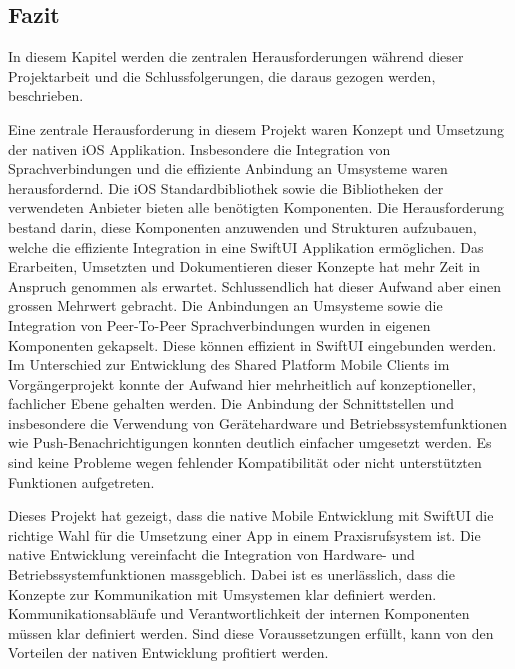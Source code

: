 \subsection{Fazit}

In diesem Kapitel werden die zentralen Herausforderungen während dieser Projektarbeit und die Schlussfolgerungen, die daraus gezogen werden, beschrieben.

Eine zentrale Herausforderung in diesem Projekt waren Konzept und Umsetzung der nativen iOS Applikation.
Insbesondere die Integration von Sprachverbindungen und die effiziente Anbindung an Umsysteme waren herausfordernd.
Die iOS Standardbibliothek sowie die Bibliotheken der verwendeten Anbieter bieten alle benötigten Komponenten.
Die Herausforderung bestand darin, diese Komponenten anzuwenden und Strukturen aufzubauen, welche die effiziente Integration in eine SwiftUI Applikation ermöglichen.
Das Erarbeiten, Umsetzten und Dokumentieren dieser Konzepte hat mehr Zeit in Anspruch genommen als erwartet.
Schlussendlich hat dieser Aufwand aber einen grossen Mehrwert gebracht.
Die Anbindungen an Umsysteme sowie die Integration von Peer-To-Peer Sprachverbindungen wurden in eigenen Komponenten gekapselt.
Diese können effizient in SwiftUI eingebunden werden.
Im Unterschied zur Entwicklung des Shared Platform Mobile Clients im Vorgängerprojekt konnte der Aufwand hier mehrheitlich auf konzeptioneller, fachlicher Ebene gehalten werden.
Die Anbindung der Schnittstellen und insbesondere die Verwendung von Gerätehardware und Betriebssystemfunktionen wie Push-Benachrichtigungen konnten deutlich einfacher umgesetzt werden.
Es sind keine Probleme wegen fehlender Kompatibilität oder nicht unterstützten Funktionen aufgetreten.

Dieses Projekt hat gezeigt, dass die native Mobile Entwicklung mit SwiftUI die richtige Wahl für die Umsetzung einer App in einem Praxisrufsystem ist.
Die native Entwicklung vereinfacht die Integration von Hardware- und Betriebssystemfunktionen massgeblich.
Dabei ist es unerlässlich, dass die Konzepte zur Kommunikation mit Umsystemen klar definiert werden.
Kommunikationsabläufe und Verantwortlichkeit der internen Komponenten müssen klar definiert werden.
Sind diese Voraussetzungen erfüllt, kann von den Vorteilen der nativen Entwicklung profitiert werden.

